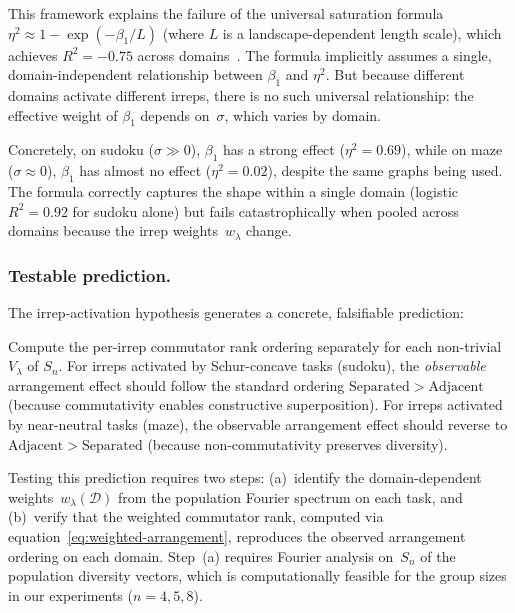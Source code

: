 This framework explains the failure of the universal saturation
formula $\eta^2 \approx 1 - \exp(-\beta_1 / L)$ (where $L$ is
a landscape-dependent length scale), which achieves $R^2 = -0.75$
across domains~\cite{lyra2026topology}.  The formula implicitly
assumes a single, domain-independent relationship between $\beta_1$
and $\eta^2$.  But because different domains activate different
irreps, there is no such universal relationship: the effective weight
of $\beta_1$ depends on~$\sigma$, which varies by domain.

Concretely, on sudoku ($\sigma \gg 0$), $\beta_1$ has a strong
effect ($\eta^2 = 0.69$), while on maze ($\sigma \approx 0$),
$\beta_1$ has almost no effect ($\eta^2 = 0.02$), despite the
same graphs being used.  The formula correctly captures the
shape within a single domain (logistic $R^2 = 0.92$ for sudoku
alone) but fails catastrophically when pooled across domains because
the irrep weights~$w_\lambda$ change.

\subsubsection{Testable prediction.}

The irrep-activation hypothesis generates a concrete, falsifiable
prediction:

\begin{prediction}
\label{pred:per-irrep-reversal}
Compute the per-irrep commutator rank ordering separately for each
non-trivial $V_\lambda$ of $S_n$.  For irreps activated by
Schur-concave tasks (sudoku), the \emph{observable} arrangement
effect should follow the standard ordering
$\mathrm{Separated} > \mathrm{Adjacent}$ (because commutativity
enables constructive superposition).  For irreps activated by
near-neutral tasks (maze), the observable arrangement effect should
reverse to $\mathrm{Adjacent} > \mathrm{Separated}$ (because
non-commutativity preserves diversity).
\end{prediction}

\noindent
Testing this prediction requires two steps: (a)~identify the
domain-dependent weights~$w_\lambda(\mathcal{D})$ from the population
Fourier spectrum on each task, and (b)~verify that the weighted
commutator rank, computed via
equation~\eqref{eq:weighted-arrangement}, reproduces the observed
arrangement ordering on each domain.  Step~(a) requires
Fourier analysis on~$S_n$ of the population diversity vectors, which
is computationally feasible for the group sizes in our experiments
($n = 4, 5, 8$).

